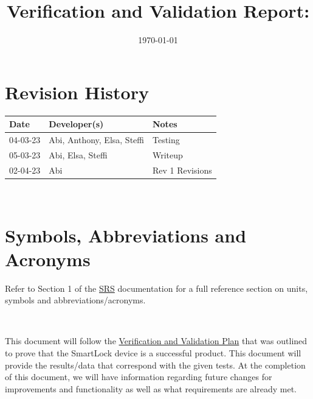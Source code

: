 \documentclass[12pt, titlepage]{article}
\begin{document}
\title{Verification and Validation Report: \progname} 
\author{\authname}
\date{\today}
	
\maketitle


\section{Revision History}

\begin{tabularx}{\textwidth}{p{2cm}p{5cm}X}
\toprule {\bf Date} & {\bf Developer(s)} & {\bf Notes}\\
\midrule
04-03-23& Abi, Anthony, Elsa, Steffi & Testing\\
05-03-23& Abi, Elsa, Steffi & Writeup\\
02-04-23 & Abi & Rev 1 Revisions\\
\bottomrule
\end{tabularx}

~\newpage

\section{Symbols, Abbreviations and Acronyms}

Refer to Section 1 of the \href{https://github.com/NevoAbigail/Capstone/blob/main/docs/SRS/SRS.pdf}{SRS} documentation for a full reference section on units, symbols and abbreviations/acronyms.

\-\



\newpage

\tableofcontents

\listoftables %

\listoffigures %

\newpage


This document will follow the \href{https://github.com/NevoAbigail/Capstone/blob/main/docs/VnVPlan/VnVPlan.pdf}{Verification and Validation Plan} that was outlined to prove that the SmartLock device is a successful product. This document will provide the results/data that correspond with the given tests. At the completion of this document, we will have information regarding future changes for improvements and functionality as well as what requirements are already met. 
\end{document}
